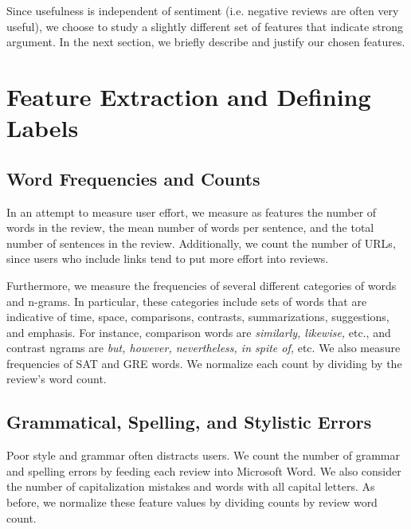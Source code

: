 \documentclass[letterpaper]{article}
\begin{document}
Since usefulness is independent of sentiment (i.e. negative reviews are often
very useful), we choose to study a slightly different set of features that
indicate strong argument. In the next section, we briefly describe and justify
our chosen features.

\section{Feature Extraction and Defining Labels}

\subsection{Word Frequencies and Counts}
In an attempt to measure user effort, we measure as features the number of 
words in the review, the mean number of words per sentence, and the total 
number of sentences in the review. Additionally, we count the number of URLs, 
since users who include links tend to put more effort into reviews.

Furthermore, we measure the frequencies of several different categories of 
words and n-grams.  In particular, these categories include sets of words that
are indicative of time, space, comparisons, contrasts, summarizations,
suggestions, and emphasis.  For instance, comparison words are \emph{similarly,
likewise,} etc., and contrast ngrams are \emph{but, however, nevertheless, 
in spite of,} etc. We also measure frequencies of SAT and GRE words.  We 
normalize each count by dividing by the review's word count.

\subsection{Grammatical, Spelling, and Stylistic Errors}
Poor style and grammar often distracts users.  We count the number of grammar 
and spelling errors by feeding each review into Microsoft Word. We also 
consider the number of capitalization mistakes and words with all capital 
letters. As before, we normalize these feature values by dividing
counts by review word count.
\end{document}
